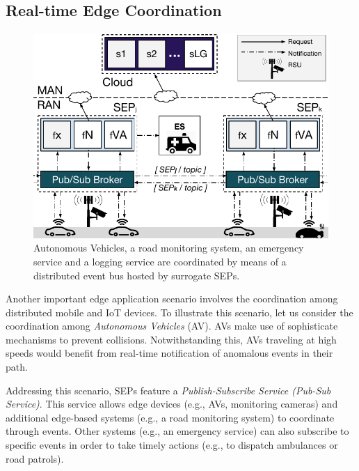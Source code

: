 \subsection{Real-time Edge Coordination}\label{sec:SEP_RTEC}

\begin{figure}[bp]
	\centering
	\includegraphics[width=1\linewidth]{Figs/Edge_Coordination_AVs_wide.pdf}
	\caption{Autonomous Vehicles, a road monitoring system, an emergency service and a logging service are coordinated by means of a distributed event bus hosted by surrogate SEPs.}
	\label{fig:Edge_Coordination_AVs}
\end{figure}

Another important edge application scenario involves the coordination among distributed mobile and IoT devices. %
To illustrate this scenario, let us consider the coordination among \textit{Autonomous Vehicles} (AV). %
AVs make use of sophisticate mechanisms to prevent collisions. Notwithstanding this, AVs traveling at high speeds would benefit from real-time notification of anomalous events in their path. 

Addressing this scenario, SEPs feature a \textit{Publish-Subscribe Service (Pub-Sub Service)}. This service allows edge devices (e.g., AVs, monitoring cameras) and additional edge-based systems (e.g., a road monitoring system) to coordinate through events.
Other systems (e.g., an emergency service) can also subscribe to specific events in order to take timely actions (e.g., to dispatch ambulances or road patrols).

